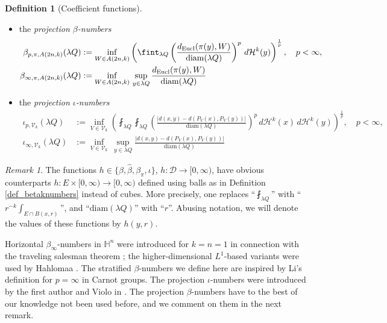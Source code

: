 \documentclass[12pt]{amsart}
\newcommand{\diam}{{\rm diam}}
\numberwithin{equation}{section}
\theoremstyle{plain}
\theoremstyle{definition}
\newtheorem{definition}[theorem]{Definition}
\theoremstyle{remark}
\newtheorem{remark}[theorem]{Remark}
\begin{document}
\begin{definition}[Coefficient functions]
\begin{itemize}
\begin{align*}
\end{align*}
    \item  the \emph{projection $\beta$-numbers}
    \begin{align*}\beta_{p,\pi,A(2n,k)}(\lambda Q)&:=\inf_{W\in A(2n,k)}\left(\fint_{\lambda Q}\left(\frac{d_{\mathrm{Eucl}}(\pi(y),W)}{\diam (\lambda Q)}\right)^p\,d\mathcal{H}^k(y)\right)^{\frac{1}{p}},\quad p<\infty,\\
\beta_{\infty,\pi,A(2n,k)}(\lambda Q)&:=\inf_{W\in A(2n,k)}\,  \sup_{y\in \lambda Q} \frac{d_{\mathrm{Eucl}}(\pi(y),W)}{\diam (\lambda Q)}
\end{align*}
\item the \emph{projection $\iota$-numbers}
\begin{align*}\iota_{p,\mathcal{V}_k}(\lambda Q) &:=\inf_{V\in\mathcal V_k }\left(\fint_{\lambda Q}\fint_{\lambda Q}\left(\frac{\left|d(x,y)-d(P_V(x),P_V(y))\right|}{\mathrm{diam}(\lambda Q)}\right)^p\,d\mathcal{H}^k(x)\,d\mathcal{H}^k(y)\right)^{\frac{1}{p}},\quad p<\infty,\\\iota_{\infty,\mathcal{V}_k}(\lambda Q) &:=\inf_{V\in\mathcal V_k }\,  \sup_{y\in \lambda Q} \frac{\left|d(x,y)-d(P_V(x),P_V(y))\right|}{\mathrm{diam}(\lambda Q)} \end{align*}
\end{itemize}
\end{definition}
\begin{remark}\label{r:BallGeom}
The functions $h\in \{\beta, \widehat\beta,\beta_{\pi},\iota\}$, $h:\mathcal{D} \to [0,\infty)$, have obvious counterparts $h:E \times [0,\infty) \to [0,\infty)$ defined using balls as in Definition \ref{def_betaknumbers} instead of cubes. More precisely, one replaces ``$\fint_{\lambda Q}$'' with ``$r^{-k}\int_{E\cap B(x,r)}$'', and ``$\mathrm{diam}(\lambda Q)$'' with ``$r$''.
Abusing notation, we will denote the values of these functions by $h(y,r)$. 
\end{remark}


Horizontal $\beta_{\infty}$-numbers in $\mathbb{H}^n$ were introduced for $k=n=1$ in connection with the traveling salesman theorem \cite{MR2371434}; the higher-dimensional $L^1$-based variants were used by Hahlomaa \cite{Hahlomaa}. The stratified $\beta$-numbers we define here are inspired by Li's definition \cite{Li} for $p=\infty$ in Carnot groups. The projection $\iota$-numbers were introduced by the first author and Violo in \cite{FV2}. The projection $\beta$-numbers have to the best of our knowledge not been used before, and we comment on them in the next remark.
\end{document}
